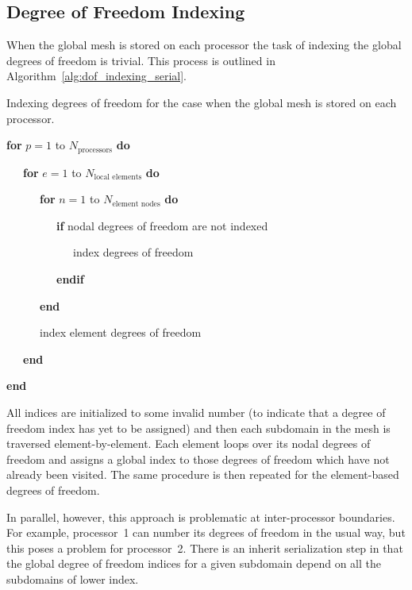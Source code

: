 \subsection{Degree of Freedom Indexing}
When the global mesh is stored on each processor the task of indexing the global degrees of freedom is trivial.  This process is outlined in Algorithm~\ref{alg:dof_indexing_serial}.
\begin{algorithm}[!htb]
  \noindent
  \centering
  \caption{Indexing degrees of freedom for the case when the global mesh is stored on each processor.\label{alg:dof_indexing_serial}}
   \begin{minipage}{.95\textwidth}
     \noindent
     \sffamily
     \begin{list}{:\ \ }{}
       \renewcommand{\baselinestretch}{1.0} \setlength{\itemsep}{-1ex}
       \item \textbf{for} $p=1$ to $N_{\text{processors}}$ \textbf{do}
   	\item \ \ \ \textbf{for} $e=1$ to $N_{\text{local elements}}$ \textbf{do}
   	\item \ \ \ \ \ \ \textbf{for} $n=1$ to $N_{\text{element nodes}}$ \textbf{do}
   	\item \ \ \ \ \ \ \ \ \ \textbf{if} nodal degrees of freedom are not indexed
   	\item \ \ \ \ \ \ \ \ \ \ \ \ index degrees of freedom
   	\item \ \ \ \ \ \ \ \ \ \textbf{endif}
   	\item \ \ \ \ \ \ \textbf{end}
   	\item \ \ \ \ \ \ index element degrees of freedom
   	\item \ \ \ \textbf{end}
       \item \textbf{end} \\
     \end{list}
   \end{minipage}
\end{algorithm}
All indices are initialized to some invalid number (to indicate that a degree of freedom index has yet to be assigned) and then each subdomain in the mesh is traversed element-by-element.  Each element loops over its nodal degrees of freedom and assigns a global index to those degrees of freedom which have not already been visited.  The same procedure is then repeated for the element-based degrees of freedom.

In parallel, however, this approach is problematic at inter-processor boundaries.  For example, processor~1 can number its degrees of freedom in the usual way, but this poses a problem for processor~2.  There is an inherit serialization step in that the global degree of freedom indices for a given subdomain depend on all the subdomains of lower index.

